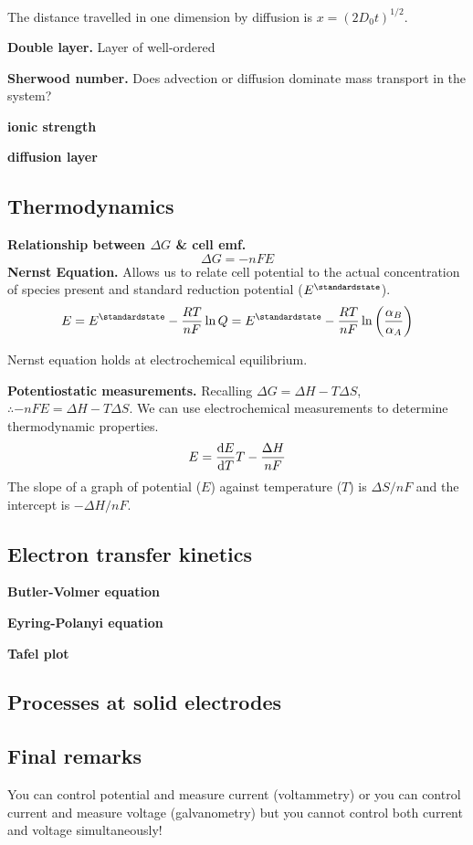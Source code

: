 The distance travelled in one dimension by diffusion is $x = (2D_0t)^{1/2}$.

\textbf{Double layer.} Layer of well-ordered

\textbf{Sherwood number.} Does advection or diffusion dominate mass transport in the system?

\textbf{ionic strength}

\textbf{diffusion layer}

\subsection*{Thermodynamics}
\textbf{Relationship between $\Delta G$ \& cell emf.}
\begin{equation*}
    \Delta G = -nFE
\end{equation*}
\textbf{Nernst Equation.} Allows us to relate cell potential to the actual concentration of species
present and standard reduction potential ($E^\standardstate$).
\begin{equation*}
    E = E^\standardstate - \frac{RT}{nF} \ln Q = E^\standardstate - \frac{RT}{nF} \ln\left(\frac{\alpha_B}{\alpha_A}\right)
\end{equation*}

Nernst equation holds at electrochemical equilibrium.



\textbf{Potentiostatic measurements.} Recalling $\Delta G = \Delta H - T \Delta S$, 
$ \therefore - nFE = \Delta H - T \Delta S$. We can use electrochemical measurements to determine
thermodynamic properties.
\begin{equation*}
    E = \odv{E}{T}T - \frac{\Delta H}{nF}
\end{equation*} The slope of a graph of potential ($E$) against temperature ($T$)
is $\Delta S / nF$ and the intercept is $- \Delta H / nF$.

\subsection*{Electron transfer kinetics}

\textbf{Butler-Volmer equation}

\textbf{Eyring-Polanyi equation}

\textbf{Tafel plot}

\subsection*{Processes at solid electrodes}


\subsection*{Final remarks}
You can control potential and measure current (voltammetry) or you can control current
and measure voltage (galvanometry) but you cannot control both current and voltage
simultaneously!


